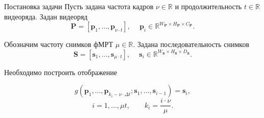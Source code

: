 \documentclass{beamer}
\begin{document}
\begin{frame}{Постановка задачи}
    Пусть задана частота кадров $\nu \in \mathbb{R}$ и продолжительность $t \in \mathbb{R}$ видеоряда. 
	Задан видеоряд
	\begin{equation*}
		\label{eq1}
		\mathbf{P} = [\mathbf{p}_1, \ldots, \mathbf{p}_{\nu \cdot t}], \quad\
		\mathbf{p}_i \in \mathbb{R}^{W_{\mathbf{P}} \times H_{\mathbf{P}} \times C_{\mathbf{P}}}.
	\end{equation*}

	Обозначим частоту снимков фМРТ $\mu \in \mathbb{R}$. Задана последовательность снимков 
	\begin{equation*}
		\label{eq2}
		\mathbf{S} = [\mathbf{s}_1, \ldots, \mathbf{s}_{\mu \cdot t}], \quad\
		\mathbf{s}_i \in \mathbb{R}^{W_{\mathbf{S}} \times H_{\mathbf{S}} \times D_{\mathbf{S}}}.
	\end{equation*}

	Необходимо построить отображение
    \begin{block}{}
        \begin{equation*}
            \label{eq3}
            g(\mathbf{p}_1, \ldots, \mathbf{p}_{k_i - \nu \cdot \Delta t}; \mathbf{s}_1, \ldots, \mathbf{s}_{i-1}) = \mathbf{s}_i,
        \end{equation*}
        \begin{equation*}
            \label{eq4}
            i = 1, \ldots, \mu t, \qquad k_i = \dfrac{i \cdot \nu}{\mu}.
        \end{equation*}
    \end{block}
\end{frame}
\end{document}
